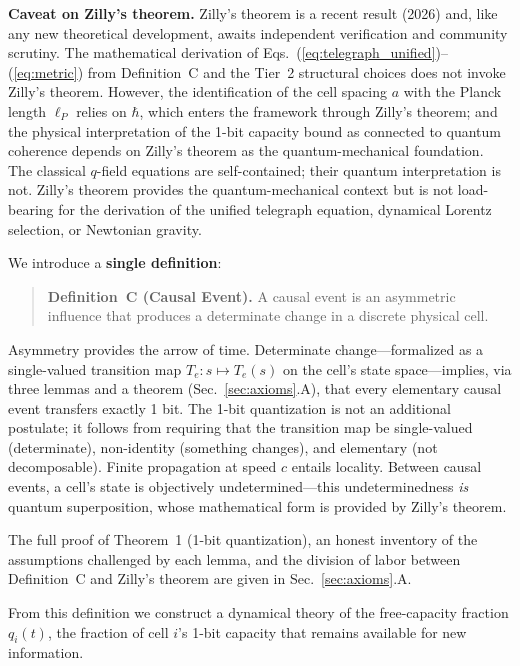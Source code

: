 \documentclass[aps,prd,twocolumn,showpacs,superscriptaddress,preprintnumbers]{revtex4-2}
\begin{document}
\textbf{Caveat on Zilly's theorem.}
Zilly's theorem is a recent result (2026) and, like any new theoretical development, awaits independent verification and community scrutiny.
The mathematical derivation of Eqs.~(\ref{eq:telegraph_unified})--(\ref{eq:metric}) from Definition~C and the Tier~2 structural choices does not invoke Zilly's theorem. However, the identification of the cell spacing $a$ with the Planck length $\ell_P$ relies on $\hbar$, which enters the framework through Zilly's theorem; and the physical interpretation of the 1-bit capacity bound as connected to quantum coherence depends on Zilly's theorem as the quantum-mechanical foundation. The classical $q$-field equations are self-contained; their quantum interpretation is not.
Zilly's theorem provides the quantum-mechanical context but is not load-bearing for the derivation of the unified telegraph equation, dynamical Lorentz selection, or Newtonian gravity.

We introduce a \textbf{single definition}:

\begin{quote}
\textbf{Definition~C (Causal Event).} A causal event is an asymmetric influence that produces a determinate change in a discrete physical cell.
\end{quote}

Asymmetry provides the arrow of time. Determinate change---formalized as a single-valued transition map $T_e: s \mapsto T_e(s)$ on the cell's state space---implies, via three lemmas and a theorem (Sec.~\ref{sec:axioms}.A), that every elementary causal event transfers exactly 1 bit. The 1-bit quantization is not an additional postulate; it follows from requiring that the transition map be single-valued (determinate), non-identity (something changes), and elementary (not decomposable). Finite propagation at speed $c$ entails locality. Between causal events, a cell's state is objectively undetermined---this undeterminedness \emph{is} quantum superposition, whose mathematical form is provided by Zilly's theorem.

The full proof of Theorem~1 (1-bit quantization), an honest inventory of the assumptions challenged by each lemma, and the division of labor between Definition~C and Zilly's theorem are given in Sec.~\ref{sec:axioms}.A.

From this definition we construct a dynamical theory of the free-capacity fraction $q_i(t)$, the fraction of cell $i$'s 1-bit capacity that remains available for new information.
\end{document}
